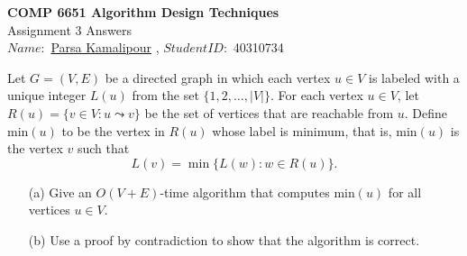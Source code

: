 \documentclass[10pt,letter,notitlepage]{article}
\newcommand{\red}[1]{{\color{red}#1}}
\newcounter{exercise}
\begin{document}
\begin{center}
  \large{\textbf{COMP 6651 Algorithm Design Techniques} \\ Assignment 3 Answers} \\


$Name:$ \href{https://benymaxparsa.github.io}{Parsa Kamalipour} \; , \; $Student ID:$ 40310734

\end{center}
%    
%
%


\begin{exercise}[(20 marks)]
Let \( G = (V, E) \) be a directed graph in which each vertex \( u \in V \) is labeled with a unique integer \( L(u) \) from the set \( \{1, 2, \dots, |V|\} \). For each vertex \( u \in V \), let \( R(u) = \{ v \in V : u \leadsto v \} \) be the set of vertices that are reachable from \( u \). Define \( \text{min}(u) \) to be the vertex in \( R(u) \) whose label is minimum, that is, \( \text{min}(u) \) is the vertex \( v \) such that
\[
L(v) = \min \{ L(w) : w \in R(u) \}.
\]

\begin{enumerate}
    \item[(a)] Give an \( O(V + E) \)-time algorithm that computes \( \text{min}(u) \) for all vertices \( u \in V \).
    \item[(b)] Use a proof by contradiction to show that the algorithm is correct.
\end{enumerate}

\end{exercise}
\end{document}
